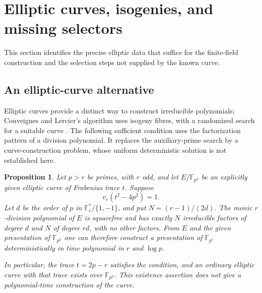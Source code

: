 \documentclass[11pt]{article}
\newtheorem{proposition}[theorem]{Proposition}
\theoremstyle{definition}
\theoremstyle{remark}
\begin{document}
\section{Elliptic curves, isogenies, and missing selectors}
This section identifies the precise elliptic data that suffice for the finite-field construction and the selection steps not supplied by the known curve.

\subsection{An elliptic-curve alternative}

Elliptic curves provide a distinct way to construct irreducible
polynomials; Couveignes and Lercier's algorithm uses isogeny fibres,
with a randomized search for a suitable curve
\cite[\S4]{CouveignesLercier2013}.
The following sufficient condition uses the factorization pattern
of a division polynomial.  It replaces the auxiliary-prime search
by a curve-construction problem, whose uniform deterministic solution
is not established here.

\begin{proposition}\label{prop:elliptic-trace-gate}
Let $p>r$ be primes, with $r$ odd, and let
$E/\mathbb F_{p^2}$ be an explicitly given elliptic curve of
Frobenius trace $t$.  Suppose
\[
 v_r(t^2-4p^2)=1.
\]
Let $d$ be the order of $p$ in
$\mathbb F_r^*/\{1,-1\}$, and put $N=(r-1)/(2d)$.
The monic $r$-division polynomial of $E$ is squarefree and has
exactly $N$ irreducible factors of degree $d$ and $N$ of degree $rd$,
with no other factors.
From $E$ and the given presentation of $\mathbb F_{p^2}$ one can
therefore construct a presentation of $\mathbb F_{p^r}$
deterministically in time polynomial in $r$ and $\log p$.

In particular, the trace $t=2p-r$ satisfies the condition, and an
ordinary elliptic curve with that trace exists over $\mathbb F_{p^2}$.
This existence assertion does not give a polynomial-time
construction of the curve.
\end{proposition}
\end{document}
